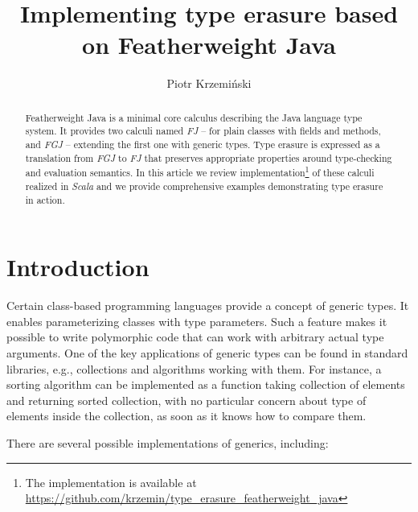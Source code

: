 \documentclass{article}[12pt]
\author{Piotr Krzemiński}
\title{Implementing type erasure based on Featherweight Java}
\date{}
\begin{document}
\maketitle


\begin{abstract}
Featherweight Java is a minimal core calculus describing the Java
language type system. It provides two calculi named \emph{FJ} --
for plain classes with fields and methods, and \emph{FGJ} -- extending
the first one with generic types. Type erasure is expressed as
a translation from \emph{FGJ} to \emph{FJ} that preserves appropriate
properties around type-checking and evaluation semantics. In this
article we review implementation\footnote{The implementation is available
at \url{https://github.com/krzemin/type_erasure_featherweight_java}}
of these calculi realized in \emph{Scala} and we provide comprehensive
examples demonstrating type erasure in action.
\end{abstract}


\section{Introduction}

Certain class-based programming languages provide a concept of generic
types. It enables parameterizing classes with type parameters.
Such a feature makes it possible to write polymorphic code that can
work with arbitrary actual type arguments. One of the key applications
of generic types can be found in standard libraries, e.g.,
collections and algorithms working with them. For instance, a
sorting algorithm can be implemented as a function taking
collection of elements and returning sorted collection, with no
particular concern about type of elements inside the collection, as
soon as it knows how to compare them.

There are several possible implementations of generics, including:
\end{document}
